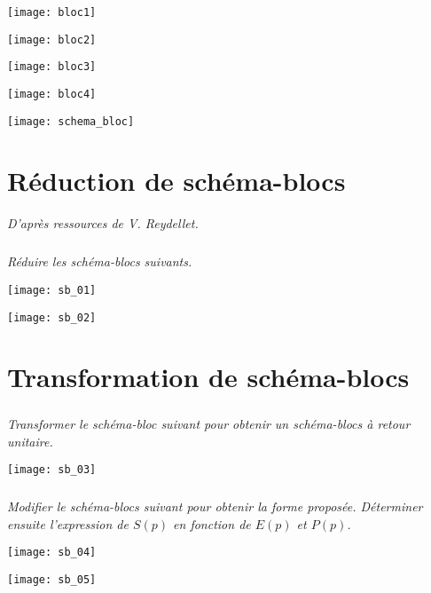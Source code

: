 \begin{multicols}{2}
\begin{corrige}
\begin{minipage}[c]{.23\linewidth}
\begin{center}
\texttt{[image: bloc1]}
\end{center}
\end{minipage}\hfill
\begin{minipage}[c]{.23\linewidth}
\begin{center}
\texttt{[image: bloc2]}
\end{center}
\end{minipage}\hfill
\begin{minipage}[c]{.23\linewidth}
\begin{center}
\texttt{[image: bloc3]}
\end{center}
\end{minipage}\hfill
\begin{minipage}[c]{.23\linewidth}
\begin{center}
\texttt{[image: bloc4]}
\end{center}
\end{minipage}



\begin{center}
\texttt{[image: schema\_bloc]}
\end{center}
\end{corrige}
\else 
\fi




\section*{Réduction de schéma-blocs}
\textit{D'après ressources de V. Reydellet.}
\subparagraph*{}
\textit{Réduire les schéma-blocs suivants.}
\begin{center}
\texttt{[image: sb\_01]}
\end{center}

\begin{center}
\texttt{[image: sb\_02]}
\end{center}

\section*{Transformation de schéma-blocs}
\subparagraph*{}
\textit{Transformer le schéma-bloc suivant pour obtenir un schéma-blocs à retour unitaire.}
\begin{center}
\texttt{[image: sb\_03]}
\end{center}

\subparagraph*{}
\textit{Modifier le schéma-blocs suivant pour obtenir la forme proposée. Déterminer ensuite l'expression de $S(p)$ en fonction de $E(p)$ et $P(p)$.}
\begin{center}
\texttt{[image: sb\_04]}
\end{center}

\begin{center}
\texttt{[image: sb\_05]}
\end{center}

\end{multicols}

